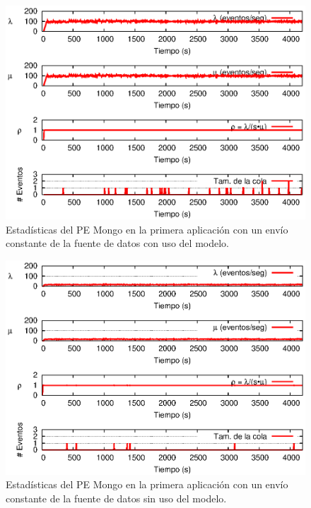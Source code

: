 \begin{figure}[!ht]
\centering
    \includegraphics[scale=1.1]{images/exp/app1/uniform/cm/statusMongoPE.eps}
    \caption{Estad\'isticas del PE Mongo en la primera aplicaci\'on con un env\'io constante de la fuente de datos con uso del modelo.}
    \label{fig:app1-uniform-statusMongoPE-cm}
\end{figure}

\begin{figure}[!ht]
\centering
    \includegraphics[scale=1.1]{images/exp/app1/uniform/sm/statusMongoPE.eps}
    \caption{Estad\'isticas del PE Mongo en la primera aplicaci\'on con un env\'io constante de la fuente de datos sin uso del modelo.}
    \label{fig:app1-uniform-statusMongoPE-sm}
\end{figure}

